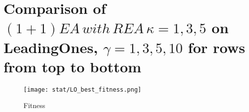\documentclass{article}
\begin{document}
\section{Comparison of $(1+1)EA\,with\,REA\,\kappa=1,3,5$ on LeadingOnes, $\gamma=1,3,5,10$ for rows from top to bottom}

\begin{figure}[H]
  \texttt{[image: stat/LO\_best\_fitness.png]}
  \caption{Fitness}
\end{figure}

%
\end{document}
